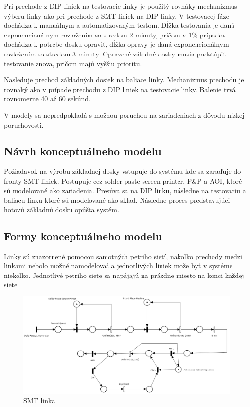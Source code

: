 \documentclass[12pt,a4paper,titlepage,final]{article}
\begin{document}
Pri prechode z DIP liniek na testovacie linky je použitý rovnáky mechanizmus
výberu linky ako pri prechode z SMT liniek na DIP linky. V testovacej fáze 
dochádza k manuálnym a automatizovaným testom. Dĺžka testovania je daná 
exponencionálnym rozložením so stredom 2 minuty, pričom v 1\% prípadov dochádza
k potrebe dosku opraviť, dĺžka opravy je daná exponencionálnym rozložením so
stredom 3 minuty. Opravené zákldné dosky musia podstúpiť testovanie znova, pričom
majú vyššiu prioritu.

Nasleduje prechod základných dosiek na baliace linky. Mechanizmus prechodu je
rovnaký ako v prípade prechodu z DIP liniek na testovacie linky. Balenie trvá 
rovnomerne 40 až 60 sekúnd.

V modely sa nepredpokladá s možnou poruchou na zariadeniach z dôvodu nízkej
poruchovosti.

\subsection{Návrh konceptuálneho modelu}
Požiadavok na výrobu základnej dosky vstupuje do systému kde sa zaraďuje do fronty
SMT liniek. Postupuje cez solder paste screen printer, P\&P a AOI, ktoré 
sú modelované ako zariadenia. Presúva sa na DIP linku, následne na testovaciu
a baliacu linku ktoré sú modelované ako sklad. Následne proces predstavujúci
hotovú základnú dosku opúšta systém.

\subsection{Formy konceptuálneho modelu}
Linky sú znazornené pomocou samotných petriho sietí, nakoľko prechody medzi linkami
nebolo možné namodelovať a jednotlivých liniek može byť v systéme niekoľko.
Jednotlivé petriho siete sa napájajú na prázdne miesto na konci každej
siete. 

\begin{figure}[!h]
  \centering
  \includegraphics[width=18cm]{smt.png}
  \caption{SMT linka}
\end{figure}
\end{document}
